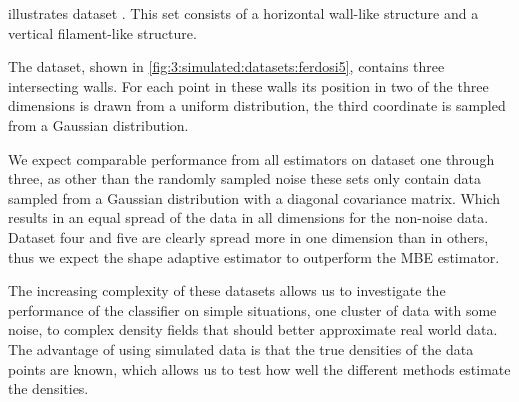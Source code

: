 


	 illustrates dataset \ferdosiFour. This set consists of a horizontal wall-like structure and a vertical filament-like structure. 

	The \ordinalstringnum{\ferdosiFiveNum} dataset, shown in \cref{fig:3:simulated:datasets:ferdosi5}, contains three intersecting walls. For each point in these walls its position in two of the three dimensions is drawn from a uniform distribution, the third coordinate is sampled from a Gaussian distribution.


We expect comparable performance from all estimators on dataset one through three, as other than the randomly sampled noise these sets only contain data sampled from a Gaussian distribution with a diagonal covariance matrix. Which results in an equal spread of the data in all dimensions for the non-noise data. Dataset four and five are clearly spread more in one dimension than in others, thus we expect the shape adaptive estimator to outperform the MBE estimator.

The increasing complexity of these datasets allows us to investigate the performance of the classifier on simple situations, one cluster of data with some noise, to complex density fields that should better approximate real world data. The advantage of using simulated data is that the true densities of the data points are known, which allows us to test how well the different methods estimate the densities.
